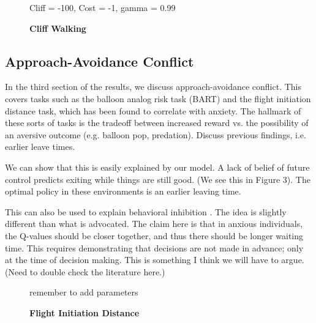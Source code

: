 \documentclass[11pt]{article} %
\begin{document}
\begin{figure}
  \centerline{%
  }
  \caption{\textbf{Cliff Walking}}
  \par Cliff = -100, Cost = -1, gamma = 0.99
\end{figure}

\subsection{Approach-Avoidance Conflict}

In the third section of the results, we discuss approach-avoidance conflict.
This covers tasks such as the balloon analog risk task (BART) and the flight
initiation distance task, which has been found to correlate with anxiety. The
hallmark of these sorts of tasks is the tradeoff between increased reward vs.
the possibility of an aversive outcome (e.g. balloon pop, predation). Discuss
previous findings, i.e. earlier leave times.

We can show that this is easily explained by our model. A lack of belief of
future control predicts exiting while things are still good. (We see this in
Figure 3). The optimal policy in these environments is an earlier leaving time.

This can also be used to explain behavioral inhibition \cite{bach2015, khemka2017}.
The idea is slightly different than what is advocated. The claim here is that
in anxious individuals, the Q-values should be closer together, and thus there
should be longer waiting time. This requires demonstrating that decisions are
not made in advance; only at the time of decision making. This is something
I think we will have to argue. (Need to double check the literature here.)

\begin{figure}
  \centerline{%
  }
  \caption{\textbf{Flight Initiation Distance}}
  \par remember to add parameters
\end{figure}
\end{document}

